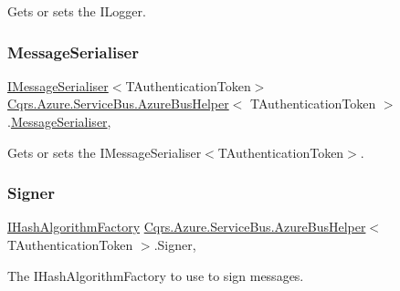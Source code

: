 Gets or sets the I\+Logger. 

\mbox{\label{classCqrs_1_1Azure_1_1ServiceBus_1_1AzureBusHelper_a6bb1cf0ca846ef1589a3b54a1cff17ed_a6bb1cf0ca846ef1589a3b54a1cff17ed}} 
\subsubsection{\texorpdfstring{Message\+Serialiser}{MessageSerialiser}}
{\footnotesize\ttfamily \hyperlink{interfaceCqrs_1_1Azure_1_1ServiceBus_1_1IMessageSerialiser}{I\+Message\+Serialiser}$<$T\+Authentication\+Token$>$ \hyperlink{classCqrs_1_1Azure_1_1ServiceBus_1_1AzureBusHelper}{Cqrs.\+Azure.\+Service\+Bus.\+Azure\+Bus\+Helper}$<$ T\+Authentication\+Token $>$.\hyperlink{classCqrs_1_1Azure_1_1ServiceBus_1_1MessageSerialiser}{Message\+Serialiser}\hspace{0.3cm}{\ttfamily [get]}, {\ttfamily [protected]}}



Gets or sets the I\+Message\+Serialiser$<$\+T\+Authentication\+Token$>$. 

\mbox{\label{classCqrs_1_1Azure_1_1ServiceBus_1_1AzureBusHelper_ab7901a2e7cdeb4010126506a6c301d00_ab7901a2e7cdeb4010126506a6c301d00}} 
\subsubsection{\texorpdfstring{Signer}{Signer}}
{\footnotesize\ttfamily \hyperlink{interfaceCqrs_1_1Bus_1_1IHashAlgorithmFactory}{I\+Hash\+Algorithm\+Factory} \hyperlink{classCqrs_1_1Azure_1_1ServiceBus_1_1AzureBusHelper}{Cqrs.\+Azure.\+Service\+Bus.\+Azure\+Bus\+Helper}$<$ T\+Authentication\+Token $>$.Signer\hspace{0.3cm}{\ttfamily [get]}, {\ttfamily [protected]}}



The I\+Hash\+Algorithm\+Factory to use to sign messages. 

